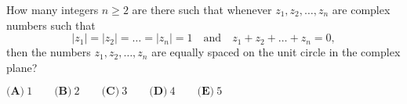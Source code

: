 How many integers $n \geq 2$ are there such that whenever $z_1, z_2, \dots, z_n$ are complex numbers such that $$|z_1| = |z_2| = \dots = |z_n| = 1\quad\text{and}\quad z_1 + z_2 + \dots + z_n = 0,$$ then the numbers $z_1, z_2, \dots, z_n$ are equally spaced on the unit circle in the complex plane?

$\textbf{(A)}\ 1 \qquad\textbf{(B)}\ 2 \qquad\textbf{(C)}\ 3 \qquad\textbf{(D)}\ 4 \qquad\textbf{(E)}\ 5$
